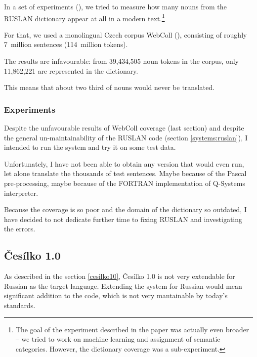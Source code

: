 In a set of experiments (\cite{florida}), we tried to measure how many nouns from the RUSLAN dictionary appear at all in a modern text.\footnote{The goal of the experiment described in the paper was actually even broader -- we tried to work on machine learning and assignment of semantic categories. However, the dictionary coverage was a sub-experiment.} 

For that, we used a monolingual Czech corpus WebColl (\cite{webcoll}), consisting of roughly 7~million sentences (114~million tokens).


The results are infavourable: from 39,434,505 noun tokens in the corpus, only 11,862,221 are represented in the dictionary.

This means that about two third of nouns would never be translated.

\subsubsection{Experiments}

Despite the unfavourable results of WebColl coverage (last section) and despite the  general un-maintainability of the RUSLAN code (section \ref{systems:ruslan}), I intended to run the system and try it on some test data.

Unfortunately, I have not been able to obtain any version that would even run, let alone translate the thousands of test sentences. Maybe because of the Pascal pre-processing, maybe because of the FORTRAN implementation of Q-Systems interpreter.

Because the coverage is so poor and the domain of the dictionary so outdated, I have decided to not dedicate further time to fixing RUSLAN and investigating the errors.

\subsection{Česílko 1.0}


As described in the section \ref{cesilko10}, Česílko 1.0 is not very extendable for Russian as the target language. Extending the system for Russian would mean significant addition to the code, which is not very mantainable by today's standards. 

